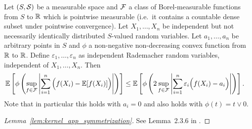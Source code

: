 \begin{lemma}
  \label{lem:kernel_app_symmetrization}

  Let $(S, \mathcal{S})$ be a measurable space and
  $\mathcal{F}$ a class of Borel-measurable functions
  from $S$ to $\mathbb{R}$ which is pointwise measurable
  (i.e.\ it contains a countable dense subset
  under pointwise convergence).
  Let $X_1, \ldots, X_n$
  be independent
  but not necessarily identically distributed
  $S$-valued random variables.
  Let $a_1, \ldots, a_n$ be arbitrary points in $S$
  and $\phi$ a non-negative non-decreasing convex function
  from $\mathbb{R}$ to $\mathbb{R}$.
  Define $\varepsilon_1, \ldots, \varepsilon_n$
  as independent Rademacher
  random variables,
  independent of $X_1, \ldots, X_n$.
  Then
  \begin{align*}
    \mathbb{E} \left[
      \phi \left(
        \sup_{f \in \mathcal{F}}
        \left|
        \sum_{i=1}^n
        \Big(
          f(X_i)
          - \mathbb{E}[f(X_i)]
        \Big)
        \right|
      \right)
    \right]
    &\leq
    \mathbb{E} \left[
      \phi \left(
        2
        \sup_{f \in \mathcal{F}}
        \left|
        \sum_{i=1}^n
        \varepsilon_i
        \Big(
          f(X_i)
          - a_i
        \Big)
        \right|
      \right)
    \right].
  \end{align*}
  Note that in particular this holds with $a_i = 0$
  and also holds with $\phi(t) = t \vee 0$.

\end{lemma}

\begin{proof}[Lemma~\ref{lem:kernel_app_symmetrization}]

  See Lemma~2.3.6 in
  \citet{van1996weak}.
\end{proof}

